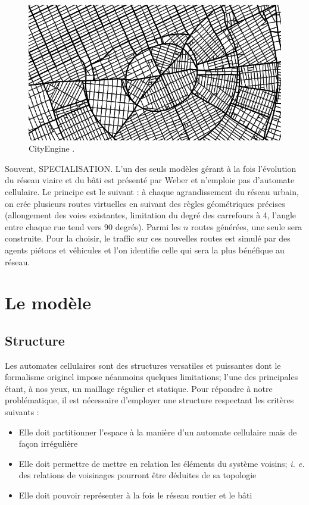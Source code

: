 \documentclass[12pt]{article}
\begin{document}
\begin{figure}
  \centering
  \includegraphics[width=.8\linewidth]{images/cityengine.png}
  \caption{CityEngine \cite{Parish2001}.}
  \label{fig:cityengine}
\end{figure}

Souvent, SPECIALISATION. L'un des seuls modèles gérant à la fois
l'évolution du réseau viaire et du bâti est présenté par Weber
\cite{Weber2009} et n'emploie pas d'automate cellulaire. Le principe
est le suivant : à chaque agrandissement du réseau urbain, on crée
plusieurs routes virtuelles en suivant des règles géométriques
précises (allongement des voies existantes, limitation du degré des
carrefours à 4, l'angle entre chaque rue tend vers 90 degrés). Parmi
les $n$ routes générées, une seule sera construite. Pour la choisir,
le traffic sur ces nouvelles routes est simulé par des agents piétons
et véhicules et l'on identifie celle qui sera la plus bénéfique au
réseau.

\section{Le modèle}

\subsection{Structure}

Les automates cellulaires sont des structures versatiles et puissantes
dont le formalisme originel impose néanmoins quelques limitations;
l'une des principales étant, à nos yeux, un maillage régulier et
statique. Pour répondre à notre problématique, il est nécessaire
d'employer une structure respectant les critères suivants :

\begin{itemize}
\item{Elle doit partitionner l'espace à la manière d'un automate
  cellulaire mais de façon irrégulière}
\item{Elle doit permettre de mettre en relation les éléments du
  système voisins; \textit{i. e.} des relations de voisinages pourront
  être déduites de sa topologie}
\item{Elle doit pouvoir représenter à la fois le réseau routier et le
  bâti}
\end{itemize}
\end{document}
